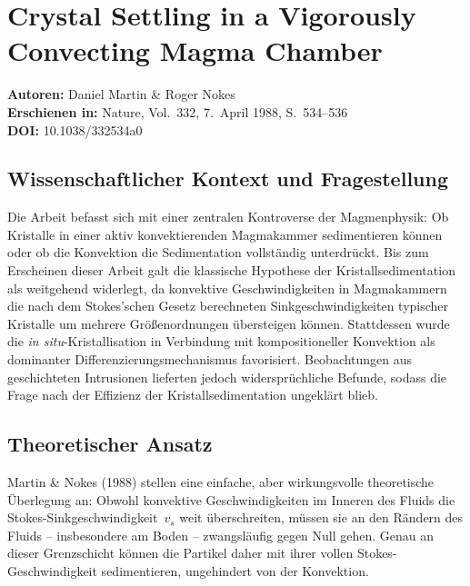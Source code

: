 \documentclass[a4paper,12pt]{article}
\begin{document}
\section*{Crystal Settling in a Vigorously Convecting Magma Chamber}

\textbf{Autoren:} Daniel Martin \& Roger Nokes\\
\textbf{Erschienen in:} Nature, Vol.~332, 7.~April 1988, S.~534--536\\
\textbf{DOI:} 10.1038/332534a0

\subsection*{Wissenschaftlicher Kontext und Fragestellung}

Die Arbeit befasst sich mit einer zentralen Kontroverse der Magmenphysik: Ob
Kristalle in einer aktiv konvektierenden Magmakammer sedimentieren können oder
ob die Konvektion die Sedimentation vollständig unterdrückt. Bis zum Erscheinen
dieser Arbeit galt die klassische Hypothese der Kristallsedimentation als
weitgehend widerlegt, da konvektive Geschwindigkeiten in Magmakammern die nach
dem Stokes'schen Gesetz berechneten Sinkgeschwindigkeiten typischer Kristalle um
mehrere Größenordnungen übersteigen können. Stattdessen wurde die \textit{in
situ}-Kristallisation in Verbindung mit kompositioneller Konvektion als
dominanter Differenzierungsmechanismus favorisiert. Beobachtungen aus
geschichteten Intrusionen lieferten jedoch widersprüchliche Befunde, sodass die
Frage nach der Effizienz der Kristallsedimentation ungeklärt blieb.

\subsection*{Theoretischer Ansatz}

Martin \& Nokes (1988) stellen eine einfache, aber wirkungsvolle theoretische
Überlegung an: Obwohl konvektive Geschwindigkeiten im Inneren des Fluids die
Stokes-Sinkgeschwindigkeit~$v_s$ weit überschreiten, müssen sie an den Rändern
des Fluids -- insbesondere am Boden -- zwangsläufig gegen Null gehen. Genau an
dieser Grenzschicht können die Partikel daher mit ihrer vollen
Stokes-Geschwindigkeit sedimentieren, ungehindert von der Konvektion.
\end{document}
